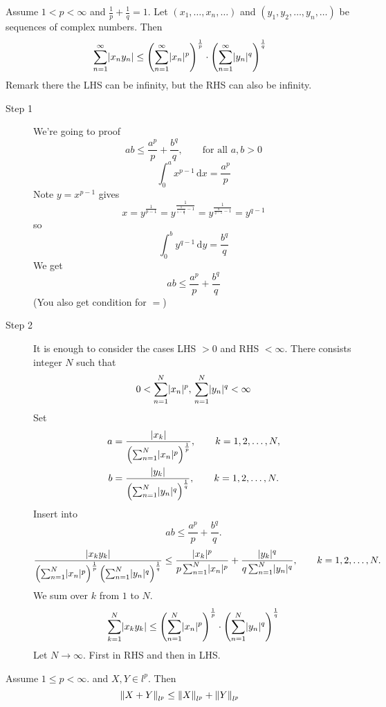 \begin{theorem}
	Assume $1<p<\infty$ and $\frac{1}{p}+ \frac{1}{q}=1$. Let $(x_1, \dots, x_n, \dots)$ and $(y_1,y_2, \dots, y_n, \dots)$ be sequences of complex numbers. Then
	\[
		\sum_{n=1}^{\infty}\lvert x_ny_n\rvert 
		\leq \left( \sum_{n=1}^{\infty}\lvert x_n\rvert^p \right)^{\frac{1}{p}} \cdot \left( \sum_{n=1}^{\infty}\lvert y_n\rvert^q \right)^{\frac{1}{q}}
	\]
	Remark there the LHS can be infinity, but the RHS can also be infinity.
\end{theorem}
\begin{beweis}
	\begin{description}
		\item[Step 1] We're going to proof 
		\[
			ab \leq \frac{a^p}{p}+ \frac{b^q}{q}, \qquad \text{for all }a,b >0
		\] 
		\[
			\int_{0}^{a} x^{p-1} \,\mathrm{d}x = \frac{a^p}{p}
		\]
		Note $y = x^{p-1}$ gives \[
			x  = y ^{\frac{1}{p-1}} = y^{\frac{1}{\frac{1}{1-\frac{1}{q}}-1}}= y ^{\frac{1}{\frac{q}{q-1}-1}} = y^{q-1}
		\] 
		so
		\[
			\int_{0}^{b}y^{q-1} \,\mathrm{d}y = \frac{b^q}{q}
		\]
		We get
		\[
			ab \leq \frac{a^p}{p}+ \frac{b^q}{q}
		\]
		(You also get condition for $=$)
		\item[Step 2] It is enough to consider the cases LHS $>0$ and RHS $< \infty$. There consists integer $N$ such that
		\[
			0 < \sum_{n=1}^{N}\lvert x_n\rvert^p, \, \sum_{n=1}^{N}\lvert y_n\rvert^q < \infty
		\]
		Set 
		\begin{align*}
			a &= \frac{\lvert x_k\rvert}{\left( \sum_{n=1}^{N}\lvert x_n\rvert^p \right)^{\frac{1}{p}}}, \qquad k = 1,2, \dots,N, \\
			b &= \frac{\lvert y_k\rvert}{\left( \sum_{n=1}^{N}\lvert y_n\rvert^q \right)^{\frac{1}{q}}}, \qquad k = 1,2, \dots,N.
		\end{align*}
		Insert into
		\[
			ab \leq \frac{a^p}{p}+ \frac{b^q}{q}.
		\]
		\[
			\frac{\lvert x_ky_k\rvert}{\left( \sum_{n=1}^{N}\lvert x_n\rvert^p \right)^{\frac{1}{p}}\left( \sum_{n=1}^{N}\lvert y_n\rvert^q \right)^{\frac{1}{q}}} 
			\leq \frac{\lvert x_k\rvert^p}{p \sum_{n=1}^{N}\lvert x_n\rvert^p} + \frac{\lvert y_k\rvert^q}{q \sum_{n=1}^{N}\lvert y_n\rvert^q}, \qquad k = 1,2, \dots, N.
		\]
		We sum over $k$ from $1$ to $N$.
		\[
			\sum_{k=1}^{N}\lvert x_ky_k\rvert \leq  \left( \sum_{n=1}^{N}\lvert x_n\rvert^p \right)^{\frac{1}{p}} \cdot \left( \sum_{n=1}^{N}\lvert y_n\rvert^q \right)^{\frac{1}{q}}
		\]
		Let $N \to \infty$. First in RHS and then in LHS. 
	\end{description}
\end{beweis}
\begin{theorem}
	Assume $1 \leq p < \infty$. and $X,Y \in l^p$. Then
	\[
		\norm{X+Y}_{l^p} \leq \norm{X}_{l^p} + \norm{Y}_{l^p}
	\]
\end{theorem}
